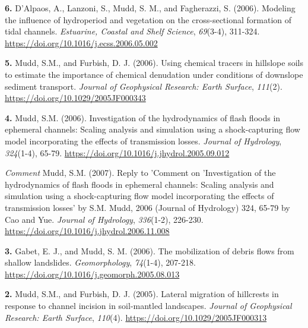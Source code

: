 \documentclass[10pt, a4paper]{article}
\newcommand{\years}[1]{\marginnote{\scriptsize #1}}
\begin{document}
\years{2006}\hangindent=0.7cm\textbf{6. }D'Alpaos, A., Lanzoni, S., Mudd, S. M., and Fagherazzi, S. (2006). Modeling the influence of hydroperiod and vegetation on the cross-sectional formation of tidal channels. \textit{Estuarine, Coastal and Shelf Science}, \textit{69}(3-4), 311-324. \href{https://doi.org/10.1016/j.ecss.2006.05.002}{https://doi.org/10.1016/j.ecss.2006.05.002}\par
\years{2006}\hangindent=0.7cm\textbf{5. }Mudd, S.M., and Furbish, D. J. (2006). Using chemical tracers in hillslope soils to estimate the importance of chemical denudation under conditions of downslope sediment transport. \textit{Journal of Geophysical Research: Earth Surface}, \textit{111}(2). \href{https://doi.org/10.1029/2005JF000343}{https://doi.org/10.1029/2005JF000343}\par

\years{2006}\hangindent=0.7cm\textbf{4. }Mudd, S.M. (2006). Investigation of the hydrodynamics of flash floods in ephemeral channels: Scaling analysis and simulation using a shock-capturing flow model incorporating the effects of transmission losses. \textit{Journal of Hydrology}, \textit{324}(1-4), 65-79. \href{https://doi.org/10.1016/j.jhydrol.2005.09.012}{https://doi.org/10.1016/j.jhydrol.2005.09.012}\par
\begin{footnotesize}
\hangindent=0.7cm\textit{Comment }Mudd, S.M. (2007). Reply to 'Comment on 'Investigation of the hydrodynamics of flash floods in ephemeral channels: Scaling analysis and simulation using a shock-capturing flow model incorporating the effects of transmission losses' by S.M. Mudd, 2006 (Journal of Hydrology) 324, 65-79 by Cao and Yue. \textit{Journal of Hydrology}, \textit{336}(1-2), 226-230. \href{https://doi.org/10.1016/j.jhydrol.2006.11.008}{https://doi.org/10.1016/j.jhydrol.2006.11.008}\par
\end{footnotesize}

\years{2006}\hangindent=0.7cm\textbf{3. }Gabet, E. J., and Mudd, S. M. (2006). The mobilization of debris flows from shallow landslides. \textit{Geomorphology}, \textit{74}(1-4), 207-218. \href{https://doi.org/10.1016/j.geomorph.2005.08.013}{https://doi.org/10.1016/j.geomorph.2005.08.013}\par


\years{2005}\hangindent=0.7cm\textbf{2. }Mudd, S.M., and Furbish, D. J. (2005). Lateral migration of hillcrests in response to channel incision in soil-mantled landscapes. \textit{Journal of Geophysical Research: Earth Surface}, \textit{110}(4). \href{https://doi.org/10.1029/2005JF000313}{https://doi.org/10.1029/2005JF000313}\par
\end{document}
